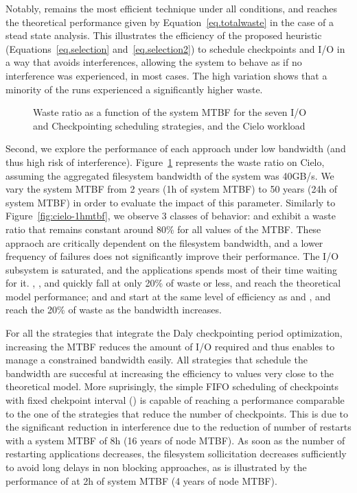 Notably, \cooperative remains the most efficient technique under all
conditions, and reaches the theoretical performance given by
Equation~\eqref{eq.totalwaste} in the case of a stead state
analysis. This illustrates the efficiency of the proposed heuristic
(Equations~\eqref{eq.selection} and~\eqref{eq.selection2}) to
schedule checkpoints and I/O in a way that avoids interferences,
allowing the system to behave as if no interference was experienced,
in most cases. The high variation shows that a minority of the runs
experienced a significantly higher waste.

\begin{figure}
  \begin{center}
    \resizebox{\linewidth}{!}{}
  \end{center}
  \caption{Waste ratio as a function of the system MTBF for the
    seven I/O and Checkpointing scheduling strategies, and the Cielo
    workload \label{fig:cielo-40gbs}}
\end{figure}

Second, we explore the performance of each approach under low
bandwidth (and thus high risk of
interference). Figure~\ref{fig:cielo-40gbs} represents the waste ratio
on Cielo, assuming the aggregated filesystem bandwidth of the system
was 40GB/s. We vary the system MTBF from 2 years (1h of system MTBF) to
50 years (24h of system MTBF) in order to evaluate the impact of this
parameter. Similarly to Figure~\ref{fig:cielo-1hmtbf}, we observe 3
classes of behavior: \propfixed and \bfifofixed exhibit a waste ratio
that remains constant around 80\% for all values of the MTBF. These
appraoch are critically dependent on the filesystem bandwidth, and a
lower frequency of failures does not significantly improve their
performance. The I/O subsystem is saturated, and the applications
spends most of their time waiting for it. \fifodaly, \fifofixed, and
\cooperative quickly fall at only 20\% of waste or less, and reach
the theoretical model performance; and \propdaly and \bfifodaly start
at the same level of efficiency as \propfixed and \bfifofixed, and
reach the 20\% of waste as the bandwidth increases.

For all the strategies that integrate the Daly checkpointing period
optimization, increasing the MTBF reduces the amount of I/O required
and thus enables to manage a constrained bandwidth easily. All
strategies that schedule the bandwidth are succesful at increasing the
efficiency to values very close to the theoretical model. More
suprisingly, the simple FIFO scheduling of checkpoints with fixed
chekpoint interval (\bfifofixed) is capable of reaching a performance
comparable to the one of the strategies that reduce the number of
checkpoints. This is due to the significant reduction in interference
due to the reduction of number of restarts with a system MTBF of 8h
(16 years of node MTBF). As soon as the number of restarting
applications decreases, the filesystem sollicitation decreases
sufficiently to avoid long delays in non blocking approaches, as is
illustrated by the performance of \fifofixed at 2h of system MTBF (4
years of node MTBF).

